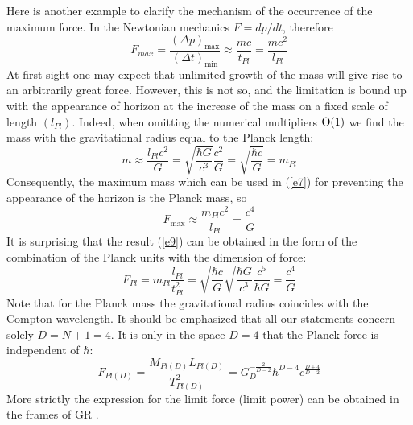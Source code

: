 \documentclass [12pt]{article}
\begin{document}
Here is another example to  clarify the mechanism of the occurrence of the maximum force. In the Newtonian mechanics $F = dp/dt$, therefore
\begin{equation}\label{e7}
  {F_{max}} = \frac{{{{(\Delta p)}_{\max }}}}{{{{\left( {\Delta t} \right)}_{\min }}}} \approx \frac{{mc}}{{{t_{Pl}}}} = \frac{{m{c^2}}}{{{l_{Pl}}}}
\end{equation}
At first sight one  may expect that unlimited growth of the mass will give rise  to an arbitrarily great  force.   However, this is not so, and the limitation is bound up with the appearance of  horizon  at the increase of the mass on a fixed scale of length $\left( {{l_{Pl}}} \right)$. Indeed, when omitting the numerical multipliers ${\rm O}(1)$ we find the mass with the gravitational radius equal to the Planck length:
\begin{equation}\label{e8}
  m \approx \frac{{{l_{Pl}}{c^2}}}{G} = \sqrt {\frac{{\hbar G}}{{{c^3}}}} \frac{{{c^2}}}{G} = \sqrt {\frac{{\hbar c}}{G}}  = {m_{Pl}}
\end{equation}
Consequently, the maximum mass which can be used in (\ref{e7}) for preventing the appearance of the horizon is the Planck mass, so
\begin{equation}\label{e9}
  {F_{\max }} \approx \frac{{{m_{Pl}}{c^2}}}{{{l_{Pl}}}} = \frac{{{c^4}}}{G}
\end{equation}
It is surprising that the result (\ref{e9}) can be obtained in the form of the combination of the Planck units with the dimension of  force:
\begin{equation}\label{e10}
  {F_{Pl}} = {m_{Pl}}\frac{{{l_{Pl}}}}{{t_{Pl}^2}} = \sqrt {\frac{{\hbar c}}{G}} \sqrt {\frac{{\hbar G}}{{{c^3}}}} \frac{{{c^5}}}{{\hbar G}} = \frac{{{c^4}}}{G}
\end{equation}
Note that for the Planck mass the gravitational radius coincides with the Compton wavelength.
It should be emphasized that all our statements concern solely $D = N + 1 = 4$. It is only in the space $D = 4$  that the Planck force is independent of $\hbar $:
\begin{equation}\label{e11}
  {F_{Pl(D)}} = \frac{{{M_{Pl(D)}}{L_{Pl(D)}}}}{{T_{Pl(D)}^2}} = G_D^{ - \frac{2}{{D - 2}}}{\hbar ^{D - 4}}{c^{\frac{{D + 4}}{{D - 2}}}}
\end{equation}
More strictly the expression for the limit force (limit power) can be obtained in the frames of GR \cite{s11}.
\end{document}
